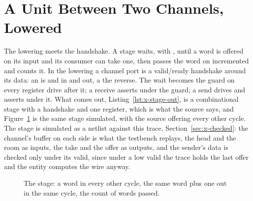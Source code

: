 \section{A Unit Between Two Channels, Lowered}
\label{sec:x-stage}

The lowering meets the handshake. A stage waits, with ,
until a word is offered on its input and its consumer can take one,
then passes the word on incremented and counts it. In the lowering a
channel port is a valid/ready handshake around its data: an
 is  and  in and  out,
a  the reverse. The wait becomes the guard on every
register drive after it; a receive asserts  under the
guard; a send drives  and asserts  under it.
What comes out, Listing~\ref{lst:x-stage-out}, is a combinational
stage with a handshake and one register, which is what the source
says, and Figure~\ref{fig:x-stage} is the same stage simulated, with
the source offering every other cycle. The stage is simulated as a
netlist against this trace, Section~\ref{sec:x-checked}: the
channel's buffer on each side is what the testbench replays, the head
and the room as inputs, the take and the offer as outputs, and the
sender's data is checked only under its valid, since under a low
valid the trace holds the last offer and the entity computes the wire
anyway.

\begin{figure}[htbp]
\centering

\caption{The stage: a word in every other cycle, the same word plus one out in the same cycle, the count of words passed.}
\label{fig:x-stage}
\end{figure}




